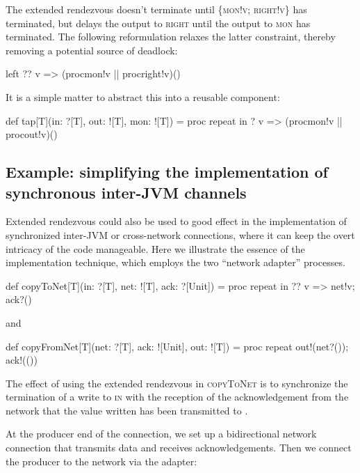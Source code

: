 \documentclass[12pt]{IOS-Book-Article-CPA-2017}
\begin{document}
The extended rendezvous doesn't terminate until \textsc{\{mon!v; right!v\}}
has terminated, but delays the output to \textsc{right} until
the output to \textsc{mon} has terminated. The following reformulation
relaxes the latter  constraint, thereby removing a potential source of
deadlock:
\begin{code+}[...]{}
    { left ?? { v => {(proc{mon!v} || proc{right!v})()} } }
\end{code+}

\noindent It is a simple matter to abstract this into a reusable component:
\begin{code+}[...]{}
    def tap[T](in: ?[T], out: ![T], mon: ![T]) =
        proc
        { repeat { in ? { v => {(proc{mon!v} || proc{out!v})()} } } }
\end{code+}

\subsection{Example: simplifying the implementation of synchronous inter-JVM channels}

Extended rendezvous could also be used to good effect in the
implementation of synchronized inter-JVM or cross-network connections,
where it can keep the overt intricacy of the code manageable. Here we
illustrate the essence of the implementation technique, which employs
the two ``network adapter'' processes.

\begin{code*}[netstuff.scala]
import io.threadcso._
object netstuff
{
\end{code*}
\begin{code+}{}
    def copyToNet[T](in: ?[T], net: ![T], ack: ?[Unit]) =
        proc { repeat { in ?? { v => { net!v; ack?() } } } }
\end{code+}
and
\begin{code+}{}
    def copyFromNet[T](net: ?[T], ack: ![Unit], out: ![T]) =
        proc { repeat { out!(net?()); ack!(()) } }
\end{code+}

The effect of using the extended rendezvous in \textsc{copyToNet}
is to synchronize the termination of a write to \textsc{in} with
the reception of the acknowledgement from the network that the
value written has been transmitted to . 


At the producer end of the connection, we set up a bidirectional
network connection that transmits data and receives 
acknowledgements. Then we connect the producer to the
network via the adapter:
\end{document}
